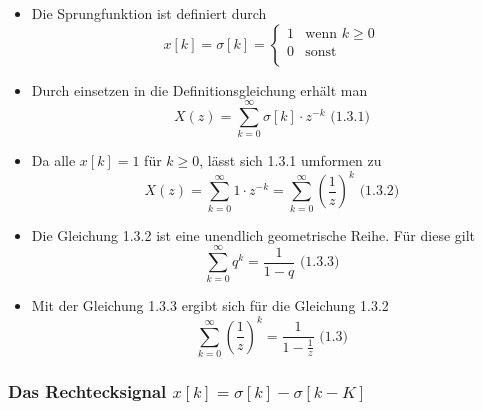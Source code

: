 \documentclass[11pt]{article}
\begin{document}
\begin{itemize}
\item
  Die Sprungfunktion ist definiert durch \[
  \displaystyle x[k] = \sigma[k] = \begin{cases}
   1 & \text{wenn $k \geq 0$} \\ 
   0 & \text{sonst} \\ 
   \end{cases}
  \]
\item
  Durch einsetzen in die Definitionsgleichung erhält man
  \[X(z) = \sum_{k=0}^\infty \sigma[k] \cdot z^{-k}\textrm{  (1.3.1)}\]
\item
  Da alle \(x[k] = 1\) für \(k \geq 0\), lässt sich 1.3.1 umformen zu
  \[X(z) = \sum_{k=0}^\infty 1 \cdot z^{-k} = \sum_{k=0}^\infty (\frac{1}{z})^k \textrm{  (1.3.2)}\]
\item
  Die Gleichung 1.3.2 ist eine unendlich geometrische Reihe. Für diese
  gilt \[\sum_{k=0}^\infty q^k = \frac{1}{1-q} \textrm{  (1.3.3)}\]
\item
  Mit der Gleichung 1.3.3 ergibt sich für die Gleichung 1.3.2
  \[\sum_{k=0}^\infty (\frac{1}{z})^k = \frac{1}{1-\frac{1}{z}} \textrm{  (1.3)}\]
\end{itemize}

    \subsubsection{\texorpdfstring{Das Rechtecksignal
\(x[k] = \sigma[k] - \sigma[k-K]\)}{Das Rechtecksignal x{[}k{]} = \textbackslash{}sigma{[}k{]} - \textbackslash{}sigma{[}k-K{]}}}\label{das-rechtecksignal-xk-sigmak---sigmak-k}
\end{document}
